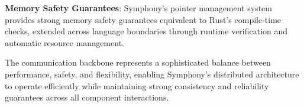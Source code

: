 \begin{successbox}
\textbf{Memory Safety Guarantees}: Symphony's pointer management system provides strong memory safety guarantees equivalent to Rust's compile-time checks, extended across language boundaries through runtime verification and automatic resource management.
\end{successbox}

The communication backbone represents a sophisticated balance between performance, safety, and flexibility, enabling Symphony's distributed architecture to operate efficiently while maintaining strong consistency and reliability guarantees across all component interactions.